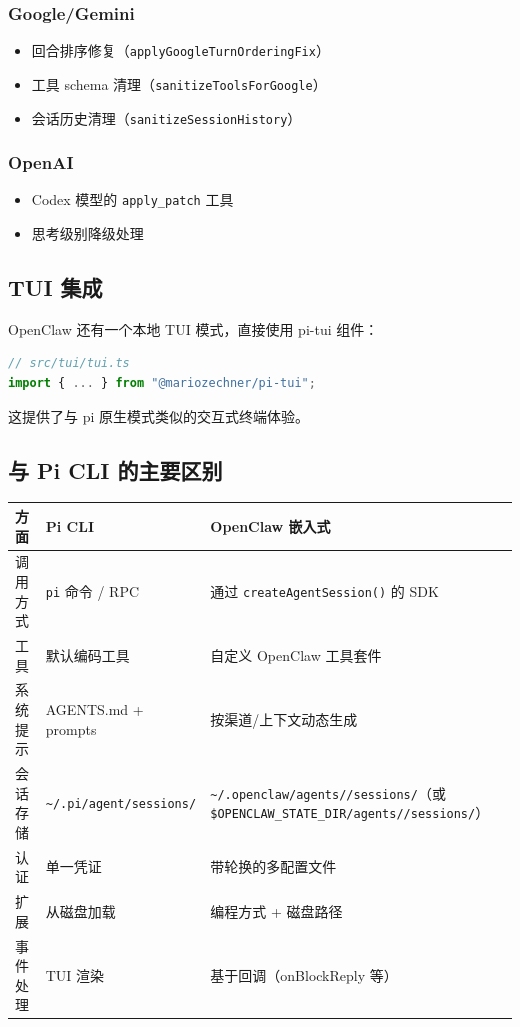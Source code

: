 \subsubsection{Google/Gemini}


\begin{itemize}
  \item 回合排序修复（\texttt{applyGoogleTurnOrderingFix}）
  \item 工具 schema 清理（\texttt{sanitizeToolsForGoogle}）
  \item 会话历史清理（\texttt{sanitizeSessionHistory}）
\end{itemize}


\subsubsection{OpenAI}


\begin{itemize}
  \item Codex 模型的 \texttt{apply\_patch} 工具
  \item 思考级别降级处理
\end{itemize}


\subsection{TUI 集成}


OpenClaw 还有一个本地 TUI 模式，直接使用 pi-tui 组件：

\begin{lstlisting}[language=typescript]
// src/tui/tui.ts
import { ... } from "@mariozechner/pi-tui";
\end{lstlisting}


这提供了与 pi 原生模式类似的交互式终端体验。

\subsection{与 Pi CLI 的主要区别}



\begin{table}[h]
\centering
\small
\begin{tabular}{|l|l|l|}
\hline
方面 & Pi CLI & OpenClaw 嵌入式 \\
\hline
调用方式 & \texttt{pi} 命令 / RPC & 通过 \texttt{createAgentSession()} 的 SDK \\
\hline
工具 & 默认编码工具 & 自定义 OpenClaw 工具套件 \\
\hline
系统提示 & AGENTS.md + prompts & 按渠道/上下文动态生成 \\
\hline
会话存储 & \texttt{\textasciitilde{}/.pi/agent/sessions/} & \texttt{\textasciitilde{}/.openclaw/agents//sessions/}（或 \texttt{\$OPENCLAW\_STATE\_DIR/agents//sessions/}） \\
\hline
认证 & 单一凭证 & 带轮换的多配置文件 \\
\hline
扩展 & 从磁盘加载 & 编程方式 + 磁盘路径 \\
\hline
事件处理 & TUI 渲染 & 基于回调（onBlockReply 等） \\
\hline
\end{tabular}
\end{table}



